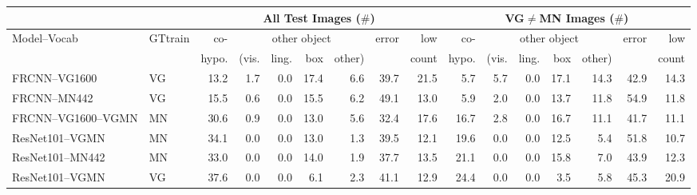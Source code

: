 \begin{table}[t]
	\centering
	\small
	\begin{tabular}{ll|r@{~}|r@{~}r@{~}r@{~}r@{~}|r@{~}r@{~}||r@{~}|r@{~}r@{~}r@{~}r@{~}|r@{~}r@{~}}
		\toprule
		&& \multicolumn{7}{c}{All Test Images ($\#$)} 
		& \multicolumn{7}{c}{VG$\neq$MN Images ($\#$)}\\
		\toprule
		Model--Vocab & GTtrain  
		&  co- &  \multicolumn{4}{c}{other object}  &  error &  low 
		&  co- &  \multicolumn{4}{c}{other object}  &  error &  low \\
		& & hypo. & (vis. &  ling. &  box &  other)   & & count 
		&  hypo. & (vis. &  ling. &  box &  other) &   & count     \\
		 
	\midrule
	FRCNN--VG1600 & VG     &                 13.2 &             1.7 &                 0.0 &                  17.4 &            6.6 &           39.7 &             21.5 &                  5.7 &             5.7 &                 0.0 &                  17.1 &           14.3 &           42.9 &             14.3 \\
	FRCNN--MN442 & VG       &                 15.5 &             0.6 &                 0.0 &                  15.5 &            6.2 &           49.1 &             13.0 &                  5.9 &             2.0 &                 0.0 &                  13.7 &           11.8 &           54.9 &             11.8 \\
	\midrule \midrule
	FRCNN--VG1600--VGMN & MN &                 30.6 &             0.9 &                 0.0 &                  13.0 &            5.6 &           32.4 &             17.6 &                 16.7 &             2.8 &                 0.0 &                  16.7 &           11.1 &           41.7 &             11.1 \\
	\midrule
	ResNet101--VGMN & MN	&                 34.1 &             0.0 &                 0.0 &                  13.0 &            1.3 &           39.5 &             12.1 &                 19.6 &             0.0 &                 0.0 &                  12.5 &            5.4 &           51.8 &             10.7 \\
	ResNet101--MN442 & MN  &                 33.0 &             0.0 &                 0.0 &                  14.0 &            1.9 &           37.7 &             13.5 &                 21.1 &             0.0 &                 0.0 &                  15.8 &            7.0 &           43.9 &             12.3 \\
	ResNet101--VGMN & VG  &                 37.6 &             0.0 &                 0.0 &                   6.1 &            2.3 &           41.1 &             12.9 &                 24.4 &             0.0 &                 0.0 &                   3.5 &            5.8 &           45.3 &             20.9 \\

\end{tabular}
\end{table}
